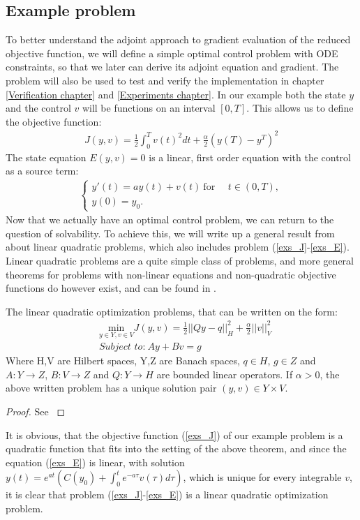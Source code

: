 \subsection{Example problem} \label{example_sec}
To better understand the adjoint approach to gradient evaluation of the reduced objective function, we will define a simple optimal control problem with ODE constraints, so that we later can derive its adjoint equation and gradient. The problem will also be used to test and verify the implementation in chapter \ref{Verification chapter} and \ref{Experiments chapter}. In our example both the state $y$ and the control $v$ will be functions on an interval $[0,T]$. This allows us to define the objective function:
\begin{align}
J(y,v) = \frac{1}{2}\int_0^Tv(t)^2dt + \frac{\alpha}{2}(y(T)-y^T)^2 \label{exs_J}
\end{align}
The state equation $E(y,v)=0$ is a linear, first order equation with the control as a source term:
\begin{align}
\left\{
     \begin{array}{lr}
       	y'(t)=ay(t) + v(t) \ \textrm{for } \quad t\in(0,T),\\
       	y(0)=y_0.
     \end{array}
   \right. \label{exs_E}
\end{align}
Now that we actually have an optimal control problem, we can return to the question of solvability. To achieve this, we will write up a general result from \cite{hinze2008optimization} about linear quadratic problems, which also includes problem (\ref{exs_J}-\ref{exs_E}). Linear quadratic problems are a quite simple class of problems, and more general theorems for problems with non-linear equations and non-quadratic objective functions do however exist, and can be found in \cite{hinze2008optimization}.
\begin{theorem}
The linear quadratic optimization problems, that can be written on the form:
\begin{align*}
&\underset{y\in Y,v\in V}{\text{min}}J(y,v) = \frac{1}{2}||Qy-q||_H^2 + \frac{\alpha}{2}||v||_V^2 \\
&\textit{Subject to:} \ Ay + Bv = g
\end{align*}
Where H,V are Hilbert spaces, Y,Z are Banach spaces, $q\in H$, $g\in Z$ and $A:Y\rightarrow Z$, $B:V\rightarrow Z$ and $Q:Y\rightarrow H$ are bounded linear operators. If $\alpha>0$, the above written problem has a unique solution pair $(y,v)\in Y\times V$.
\end{theorem}   
\begin{proof}
See \cite{hinze2008optimization}
\end{proof}
\noindent
It is obvious, that the objective function (\ref{exs_J}) of our example problem is a quadratic function that fits into the setting of the above theorem, and since the equation (\ref{exs_E}) is linear, with solution $y(t) = e^{a t}(C(y_0)+\int_0^te^{-a\tau}v(\tau)d\tau)$, which is unique for every integrable $v$, it is clear that problem (\ref{exs_J}-\ref{exs_E}) is a linear quadratic optimization problem. 
